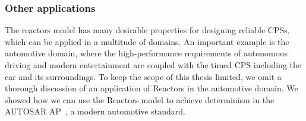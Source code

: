 \subsubsection{Other applications}

The reactors model has many desirable properties for designing reliable \acp{CPS}, which can be applied in a multitude of domains.
An important example is the automotive domain, where the high-performance requirements of autonomous driving and modern entertainment are coupled with the timed \ac{CPS} including the car and its surroundings.
To keep the scope of this thesis limited, we omit a thorough discussion of an application of Reactors in the automotive domain.
We showed how we can use the Reactors model to achieve determinism in the AUTOSAR \ac{AP}~\cite{menard_date20}, a modern automotive standard.
